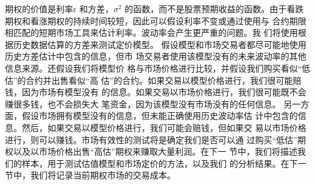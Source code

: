 \par{
    期权的价值是利率r 和方差，$\sigma^2$ 的函数，而不是股票预期收益的函数。由于看跌期权和看涨期权的持续时间较短，因此可以假设利率不变或通过使用与
    合约期限相匹配的短期市场工具来估计利率。波动率会产生更严重的问题。我
    们将使用根据历史数据估算的方差来测试定价模型。
    假设模型和市场交易者都尽可能地使用历史方差估计中包含的信息，但市
    场交易者使用该模型没有的未来波动率的其他信息来源。还假设我们将模型价
    格与市场价格进行比较，并假设我们购买看似“低估”的合约并出售看似“高
    估”的合约。如果交易以模型价格进行，我们很可能赔钱，因为市场有模型没有
    的信息。如果交易以市场价格进行，我们很可能既不会赚很多钱，也不会损失大
    笔资金，因为该模型没有市场没有的任何信息。
    另一方面，假设市场拥有模型没有的信息，但未能正确使用历史波动率估
    计中包含的信息。然后，如果交易以模型价格进行，我们可能会赔钱，但如果交
    易以市场价格进行，则可以赚钱。市场有效性的测试将是确定我们是否可以通
    过购买“低估”期权以及以市场价格出售“高估”期权来赚取大量利润。在下一
    节中，我们将描述我们的样本，用于测试估值模型和市场定价的方法，以及我们
    的分析结果。在下一节中，我们将记录当前期权市场的交易成本。
}
